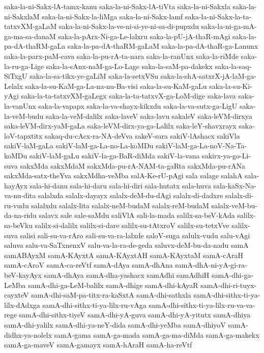 {saka-la-ni-Sakx-lA-tamx-kanu
saka-la-ni-Sakx-lA-tiVta
saka-la-ni-Sakxla
saka-la-ni-SakxlaM
saka-la-ni-Sakx-la-liMga
saka-la-ni-Sakx-lamf
saka-la-ni-Sakx-la-ta-tatxvXM-gaLaM
saka-la-ni-Sakx-la-ve-ni-si-ye-ni-sa-di-pupxdu
saka-la-ni-ga-mA-ga-ma-sa-danaM
saka-la-pArx-Ni-ga-Le-lalxru
saka-la-pU-jA-thaR-mAgi
saka-la-pa-dA-thaRM-gaLa
saka-la-pa-dA-thaRM-gaLaM
saka-la-pa-dA-thaR-ga-Lanunx
saka-la-parx-paM-cava
saka-la-pu-rA-ta-nara
saka-la-ranUnx
saka-la-riMde
saka-la-ru-ga-Lige
saka-la-sAnx-naM-ga-Lo-Lage
saka-la-saM-pa-dakekx
saka-la-saq-SiTxgU
saka-la-sa-tikx-ye-gaLiM
saka-la-setxVSu
saka-la-shA-satxrX-jA-laM-ga-Lelalx
saka-la-su-KaM-ga-La-na-nu-Ba-visi
saka-la-su-KaM-gaLu
saka-la-su-Ki-yAgi
saka-la-ta-tatxvXM-gaLegx
saka-la-ta-tatxvX-ga-LoM-dige
saka-lava
saka-la-vanUnx
saka-la-vapapx
saka-la-va-shayx-kikxdu
saka-la-va-sutx-ga-LigU
saka-la-veM-budu
saka-la-veM-dalilx
saka-laveV
saka-lavu
sakaleV
saka-leVM-dirxya
saka-leVM-dirx-yaM-gaLa
saka-leVM-dirx-ya-ga-Lalilx
saka-leY-shavxrayx
saka-loV-tapxtitx
sakaq-du-cAcx-ra-NA-deVva
sakeV-sara
sakiV-lAshacx
sakiVla
sakiV-laM-gaLa
sakiV-laM-ga-La-no-La-koMDu
sakiV-laM-ga-La-noV-Na-Ta-koMDu
sakiV-laM-gaLu
sakiV-la-ga-BaR-diMda
sakiV-la-vana
sakirx-ya-go-Li-suva
sakxMda
sakxMdaM
sakxMda-pu-rA-NAM-ta-gaRta
sakxMda-pu-rANa
sakxMda-satx-theYva
sakxMdha-veMba
salA-Ke-rU-pAgi
sala
salage
salahA
sala-hayAyx
sala-hi-danu
sala-hi-daru
sala-hi-diri
sala-hutatx
sala-huva
sala-kaSx-Na-va-nu-dita
salalxda
salalx-dayayx
salalx-deM-du-dAgi
salalx-di-dadxre
salalx-di-ru-vudu
salalxdu
salalx-lita
salalx-neM-budaM
salalx-reM-budaM
salalx-veM-bu-da-na-ridu
salavx
sale
sale-saMdu
saliVlA
sali-la-mada
salilx-sa-beV-kAda
salilx-sa-beVku
salilx-si-dalilx
salilx-si-dare
salilx-su-tAtxroV
salilx-su-tetxVve
salilx-suva
salisi
sali-su-va-rAro
sali-su-va-ra-lalxde
saloV-suga
salulx-vudu
salu-vAgi
saluva
salu-va-SaTxnenxV
salu-va-la-ra-de-geda
saluvx-deM-bu-da-nadu
samA
samABAyxM
samA-KAyxtA
samA-KAyxtAH
samA-KAyxtaM
samA-cAraH
samA-cAroV
samA-ca-reVtf
samA-dAya
samA-dhAna
samA-dhA-ni-yA-gi-ra-beV-kayAyx
samA-dhAya
samA-dha-yashacx
samAdhi
samAdhiH
samA-dhi-ga-LeMba
samA-dhi-ga-LeM-balilx
samA-dhige
samA-dhi-kAyaR
samA-dhi-ri-tuyx-cayxteV
samA-dhi-saM-pa-titx-ra-kaSxtA
samA-dhi-sathxla
samA-dhi-sithx-ti-ya-lilx-dAdxga
samA-dhi-sithx-ti-ya-lilx-ru-vAga
samA-dhi-sithx-ti-ya-lilx-ru-va-va-rege
samA-dhi-sithx-tiyeV
samA-dhi-yA-guva
samA-dhi-yA-yitutx
samA-dhiya
samA-dhi-yalilx
samA-dhi-ya-neY-dida
samA-dhi-yeMba
samA-dhiyoV
samA-didhx-ya-nolelx
samA-gama
samA-ga-mada
samA-ga-ma-diMda
samA-ga-makekx
samA-ga-maveV
samA-gamayx
samA-hAraH
samA-ha-reVtf
}
